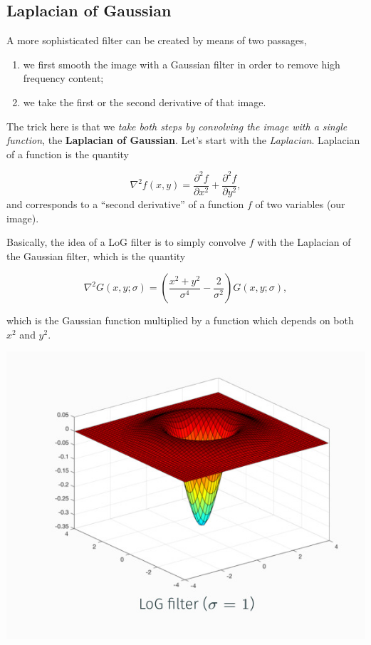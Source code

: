 \documentclass[10pt]{report}
\begin{document}
\subsection{Laplacian of Gaussian}
\label{laplacian-of-gaussian}
A more sophisticated filter can be created by means of two passages,

\begin{enumerate}
\item we first smooth the image with a Gaussian filter in order to remove
high frequency content;
\item we take the first or the second derivative of that image.
\end{enumerate}

The trick here is that we \emph{take both steps by convolving the image with
a single function}, the \textbf{Laplacian of Gaussian}. Let's start with the
\emph{Laplacian}. Laplacian of a function is the quantity

\[\nabla^2 f(x, y) = \frac{\partial^2 f}{\partial x^2} + \frac{\partial^2 f}{\partial y^2},\]
and corresponds to a ``second derivative'' of a function \(f\) of two
variables (our image).

Basically, the idea of a LoG filter is to simply convolve \(f\) with the
Laplacian of the Gaussian filter, which is the quantity

\[\nabla^2 G(x, y; \sigma) = \left(\frac{x^2 + y^2}{\sigma^4} - \frac{2}{\sigma^2}\right) G(x, y; \sigma),\]

which is the Gaussian function multiplied by a function which depends on
both \(x^2\) and \(y^2\).

\begin{center}
\includegraphics[width=.9\linewidth]{./pics/proc/log-filter.jpg}
\end{center}
\end{document}
